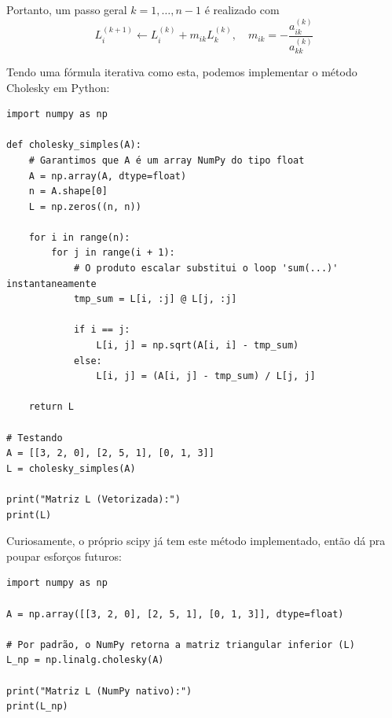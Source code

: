 \documentclass[../numerical_methods.tex]{subfiles}
\begin{document}
Portanto, um passo geral \(k=1, \dotsc , n-1\) é realizado com
\[
	\boxed{L_{i}^{(k+1)}\leftarrow L_{i}^{(k)} + m_{ik}L_{k}^{(k)},\quad m_{ik} = - \frac{a_{ik}^{(k)}}{a_{kk}^{(k)}}}
\]

Tendo uma fórmula iterativa como esta, podemos implementar o método Cholesky em Python:
\begin{listing}[H]
	\caption{Método de Cholesky em Python}
	\begin{verbatim}
import numpy as np

def cholesky_simples(A):
    # Garantimos que A é um array NumPy do tipo float
    A = np.array(A, dtype=float)
    n = A.shape[0]
    L = np.zeros((n, n))

    for i in range(n):
        for j in range(i + 1):
            # O produto escalar substitui o loop 'sum(...)' instantaneamente
            tmp_sum = L[i, :j] @ L[j, :j]

            if i == j:
                L[i, j] = np.sqrt(A[i, i] - tmp_sum)
            else:
                L[i, j] = (A[i, j] - tmp_sum) / L[j, j]

    return L

# Testando
A = [[3, 2, 0], [2, 5, 1], [0, 1, 3]]
L = cholesky_simples(A)

print("Matriz L (Vetorizada):")
print(L)
\end{verbatim}
\end{listing}
Curiosamente, o próprio scipy já tem este método implementado, então dá pra poupar esforços futuros:
\begin{listing}[H]
	\begin{verbatim}
import numpy as np

A = np.array([[3, 2, 0], [2, 5, 1], [0, 1, 3]], dtype=float)

# Por padrão, o NumPy retorna a matriz triangular inferior (L)
L_np = np.linalg.cholesky(A)

print("Matriz L (NumPy nativo):")
print(L_np)
\end{verbatim}
\end{listing}
\end{document}
